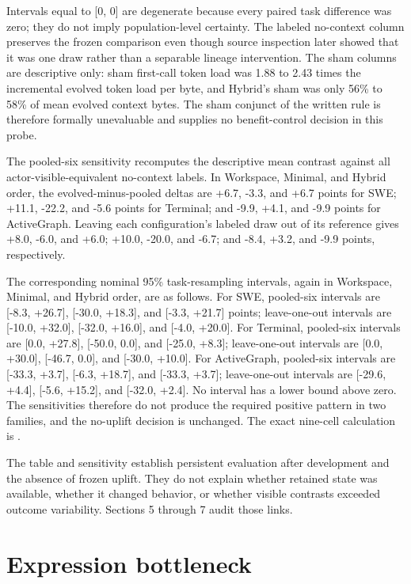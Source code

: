 \documentclass[10pt,twocolumn]{article}
\begin{document}
Intervals equal to {[}0, 0{]} are degenerate because every paired task
difference was zero; they do not imply population-level certainty. The
labeled no-context column preserves the frozen comparison even though
source inspection later showed that it was one draw rather than a
separable lineage intervention. The sham columns are descriptive only:
sham first-call token load was 1.88 to 2.43 times the incremental
evolved token load per byte, and Hybrid's sham was only 56\% to 58\% of
mean evolved context bytes. The sham conjunct of the written rule is
therefore formally unevaluable and supplies no benefit-control decision
in this probe.

The pooled-six sensitivity recomputes the descriptive mean contrast
against all actor-visible-equivalent no-context labels. In Workspace,
Minimal, and Hybrid order, the evolved-minus-pooled deltas are +6.7,
-3.3, and +6.7 points for SWE; +11.1, -22.2, and -5.6 points for
Terminal; and -9.9, +4.1, and -9.9 points for ActiveGraph. Leaving each
configuration's labeled draw out of its reference gives +8.0, -6.0, and
+6.0; +10.0, -20.0, and -6.7; and -8.4, +3.2, and -9.9 points,
respectively.

The corresponding nominal 95\% task-resampling intervals, again in
Workspace, Minimal, and Hybrid order, are as follows. For SWE,
pooled-six intervals are {[}-8.3, +26.7{]}, {[}-30.0, +18.3{]}, and
{[}-3.3, +21.7{]} points; leave-one-out intervals are {[}-10.0,
+32.0{]}, {[}-32.0, +16.0{]}, and {[}-4.0, +20.0{]}. For Terminal,
pooled-six intervals are {[}0.0, +27.8{]}, {[}-50.0, 0.0{]}, and
{[}-25.0, +8.3{]}; leave-one-out intervals are {[}0.0, +30.0{]},
{[}-46.7, 0.0{]}, and {[}-30.0, +10.0{]}. For ActiveGraph, pooled-six
intervals are {[}-33.3, +3.7{]}, {[}-6.3, +18.7{]}, and {[}-33.3,
+3.7{]}; leave-one-out intervals are {[}-29.6, +4.4{]}, {[}-5.6,
+15.2{]}, and {[}-32.0, +2.4{]}. No interval has a lower bound above
zero. The sensitivities therefore do not produce the required positive
pattern in two families, and the no-uplift decision is unchanged. The
exact nine-cell calculation is
.

The table and sensitivity establish persistent evaluation after
development and the absence of frozen uplift. They do not explain
whether retained state was available, whether it changed behavior, or
whether visible contrasts exceeded outcome variability. Sections 5
through 7 audit those links.

\section{Expression bottleneck}\label{expression-bottleneck}
\end{document}
